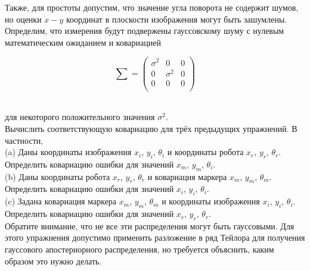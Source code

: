 \documentclass[10pt,a4paper]{article}
\begin{document}
\begin{figure}[H]
	\label{fig:615orig}
\end{figure}

Также, для простоты допустим, что значение угла поворота не содержит шумов, но оценки $x-y$ координат в плоскости изображения могут быть зашумлены. Определим, что измерения будут подвержены гауссовскому шуму с нулевым математическим ожиданием и ковариацией \\

\begin{minipage}{0.2\textwidth}
	\begin{equation*}
	\sum=
	\left(\begin{array}{ccc}
	\sigma^2&0&0\\
	0&\sigma^2&0\\
	0&0&0\\
	\end{array}\right)
	\end{equation*}
\end{minipage}\\

для некоторого положительного значения $\sigma^2$.\\

Вычислить соответствующую ковариацию для трёх предыдущих упражнений. В частности,\\

(a) Даны координаты изображения $x_i$, $y_i$, $\theta_i$ и координаты робота
$x_r$, $y_r$, $\theta_r$. Определить ковариацию ошибки для значений $x_m$, $y_m$, $\theta_i$.\\

(b) Даны координаты робота $x_r$, $y_r$, $\theta_r$ и ковариация маркера $x_m$, $y_m$, $\theta_m$. Определить ковариацию ошибки для значений $x_i$, $y_i$, $\theta_i$.\\

(c) Задана ковариация маркера $x_m$, $y_m$, $\theta_m$ и координаты изображения $x_i$, $y_i$, $\theta_i$. Определить ковариацию ошибки для значений $x_r$, $y_r$, $\theta_r$.\\

Обратите внимание, что не все эти распределения могут быть гауссовыми. Для этого упражнения допустимо применить разложение в ряд Тейлора для получения гауссового апостериорного распределения, но требуется объяснить, каким образом это нужно делать. \\
\end{document}
